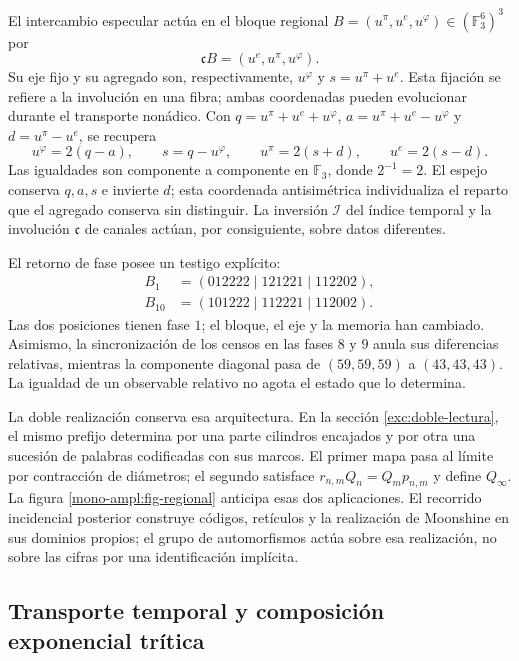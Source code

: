 El intercambio especular actúa en el bloque regional
\(B=(u^\pi,u^e,u^\varphi)\in(\mathbb F_3^6)^3\) por
\[
 \mathfrak cB=(u^e,u^\pi,u^\varphi).
\]
Su eje fijo y su agregado son, respectivamente, \(u^\varphi\) y
\(s=u^\pi+u^e\). Esta fijación se refiere a la involución en una fibra;
ambas coordenadas pueden evolucionar durante el transporte nonádico.
Con \(q=u^\pi+u^e+u^\varphi\),
\(a=u^\pi+u^e-u^\varphi\) y \(d=u^\pi-u^e\), se recupera
\[
 u^\varphi=2(q-a),\qquad s=q-u^\varphi,\qquad
 u^\pi=2(s+d),\qquad u^e=2(s-d).
\]
Las igualdades son componente a componente en \(\mathbb F_3\), donde
\(2^{-1}=2\). El espejo conserva \(q,a,s\) e invierte \(d\); esta
coordenada antisimétrica individualiza el reparto que el agregado conserva
sin distinguir. La inversión \(\mathcal I\) del índice temporal y la
involución \(\mathfrak c\) de canales actúan, por consiguiente, sobre
datos diferentes.

El retorno de fase posee un testigo explícito:
\[
 \begin{aligned}
 B_1&=(012222\mid121221\mid112202),\\
 B_{10}&=(101222\mid112221\mid112002).
 \end{aligned}
\]
Las dos posiciones tienen fase \(1\); el bloque, el eje y la memoria han
cambiado. Asimismo, la sincronización de los censos en las fases \(8\) y
\(9\) anula sus diferencias relativas, mientras la componente diagonal
pasa de \((59,59,59)\) a \((43,43,43)\). La igualdad de un observable
relativo no agota el estado que lo determina.

La doble realización conserva esa arquitectura. En la sección
\ref{exc:doble-lectura}, el mismo prefijo determina por una parte cilindros
encajados y por otra una sucesión de palabras codificadas con sus marcos.
El primer mapa pasa al límite por contracción de diámetros; el segundo
satisface \(r_{n,m}Q_n=Q_mp_{n,m}\) y define \(Q_\infty\).
La figura \ref{mono-ampl:fig-regional} anticipa esas dos aplicaciones.
El recorrido incidencial posterior construye códigos, retículos y la
realización de Moonshine en sus dominios propios; el grupo de automorfismos
actúa sobre esa realización, no sobre las cifras por una identificación
implícita.



\subsection{Transporte temporal y composición exponencial trítica}
\label{mono-ampl:euler}

